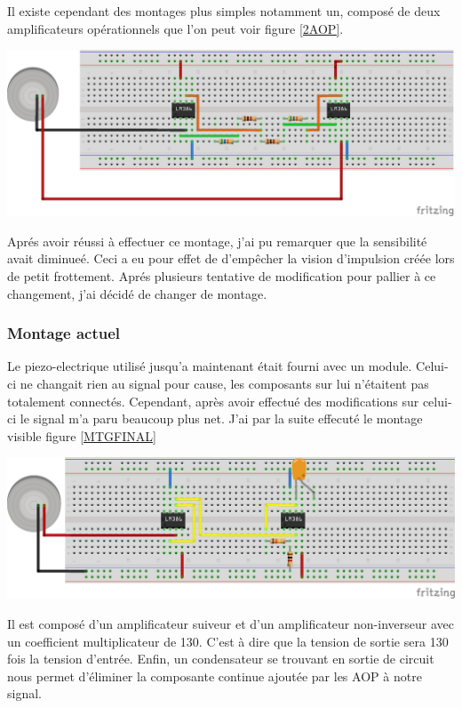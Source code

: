 \documentclass[11pt,french,a4paper]{article}
\begin{document}
Il existe cependant des montages plus simples notamment un, composé de deux amplificateurs opérationnels que l'on peut voir figure \ref{2AOP}.
\\

\begin{center}	
\includegraphics[scale=0.80]{../img/instrumentation2aop_bb.png}
\label{2AOP}
\end{center}

Aprés avoir réussi à effectuer ce montage, j’ai pu remarquer que la sensibilité avait diminueé. Ceci a eu pour effet de d’empêcher la vision d’impulsion créée lors de petit frottement. Aprés plusieurs tentative de modification pour pallier à ce changement, j’ai décidé de changer de montage.

\subsubsection{Montage actuel}
Le piezo-electrique utilisé jusqu’a maintenant était fourni avec un module. Celui-ci ne changait rien au signal pour cause, les composants sur lui n’étaitent pas totalement connectés. Cependant, après avoir effectué des modifications sur celui-ci le signal m'a paru beaucoup plus net.
J’ai par la suite effecuté le montage visible figure \ref{MTGFINAL}
\\
\begin{center}	
\includegraphics[scale=0.85]{../img/mtgfinal.png}
\label{MTGFINAL}
\end{center}
Il est composé d’un amplificateur suiveur et d’un amplificateur non-inverseur avec un coefficient multiplicateur de 130. C'est à dire que la tension de sortie sera 130 fois la tension d'entrée. Enfin, un condensateur se trouvant en sortie de circuit nous permet d’éliminer la composante continue ajoutée par les AOP à notre signal.
\end{document}
